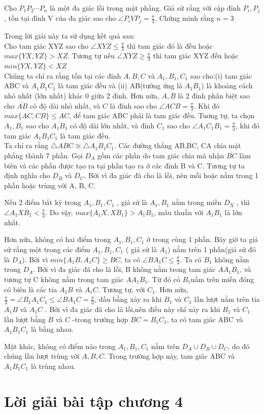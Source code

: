 \begin{baitap}
Cho $P_1P_2\cdots P_n$ là một đa giác lồi trong mặt phẳng. Giả sử rằng với cặp đỉnh $P_i,P_j$, tồn tại đỉnh V của đa giác sao cho $\angle P_iVP_j=\frac{\pi}{3}$. Chứng minh rằng $n=3$

\begin{loigiai4}
Trong lời giải này ta sử dụng kết quả sau:
\\ Cho tam giác XYZ sao cho $\angle XYZ \leq \frac{\pi}{3}$ thì tam giác đó là đều hoặc $max\{YX,YZ\}>XZ$. Tương tự nếu $\angle XYZ \geq \frac{\pi}{3}$ thì tam giác XYZ đều hoặc $min\{YX,YZ\}<XZ$
\\ Chúng ta chỉ ra rằng tồn tại các đỉnh $A, B, C$ và $ A_1, B_1, C_1$ sao cho:(i) tam giác ABC và $A_1B_1C_1$ là tam giác đều và (ii) AB(tướng ứng là $A_1B_1$) là khoảng cách nhỏ nhất (lớn nhất) khác 0 giữa 2 đỉnh. Hơn nữa, $A,B$ là 2 đỉnh phân biệt sao cho $\overline{AB}$ có độ dài nhỏ nhất, và $C$ là đỉnh sao cho $\angle ACB =\frac{\pi}{3}$. Khi đó $max\{AC,CB\}\leq AC$, để tam giác ABC phải là tam giác đều. Tuơng tự, ta chọn $A_1,B_1$ sao cho $\overline{A_1B_1}$ có độ dài lớn nhất, và đỉnh $C_1$ sao cho $\angle A_1C_1B_1=\frac{\pi}{3}$, khi đó tam giác $A_1B_1C_1$ là tam giác đều.\\
Ta chỉ ra rằng $\triangle ABC\cong \triangle A_1B_1C_1$. Các đường thẳng AB,BC, CA chia mặt phẳng thành 7 phần. Gọi $D_A$ gồm các phần do tam giác chia mà nhận $\overline{BC}$ làm biên và các phần được tạo ra tại phần tạo ra ở các đỉnh B và C. Tương tự ta định nghĩa cho $D_B$ và $D_C$. Bởi vì đa giác đã cho là lồi, nên mỗi hoặc nằm trong 1 phần hoặc trùng với  A, B, C.

Nếu 2 điểm bất kỳ trong $A_1, B_1,C_1$ , giả sử là $A_1,B_1$ nằm trong miền $D_X$ , thì $\angle A_1XB_1 <\frac{\pi}{3}$. Do vậy, $max\{A_1X,XB_1\}>A_1B_1$, mâu thuẫn với $A_1B_1$ là lớn nhất.

Hơn nữa, không có hai điểm trong $A_1,B_1,C_1$ ở trong cùng 1 phần. Bây giờ ta giả sử rằng một trong các điểm $A_1, B_1,C_1$ ( giả sử là $A_1$)  nằm trên 1 phần(giả sử đó là $D_A$). Bởi vì $min\{A_1B,A_1C\}\geq BC$, ta có $\angle BA_1C\leq \frac{\pi}{3}$. Ta có $B_1$ không nằm trong $D_A$. Bởi vì đa giác đã cho là lồi, B không nằm trong tam giác $AA_1B_1$, và tương tự C không nằm trong tam giác $AA_1B_1$. Từ đó có $B_1$nằm trên miền đóng có biên là các tia $A_1B$ và $A_1C$. Tương tự, với $C_1$. Hơn nữa, $\frac{\pi}{3}=\angle B_1A_1C_1\leq \angle BA_1C=\frac{\pi}{3}$, dấu bằng xảy ra khi $B_1$ và $C_1$ lần lượt nằm trên tia $A_1B$ và $A_1C$ . Bởi vì đa giác đã cho là lồi,nên điều này chỉ xảy ra khi $B_1$ và $C_1$ lần lượt bằng $B$ và $C$ -trong trường hợp $BC=B_1C_1$, ta có tam giác ABC và $A_1B_1C_1$ là bằng nhau.

Mặt khác, không có điểm nào trong $A_1,B_1,C_1$ nằm trên $D_A \cup D_B \cup D_C$, do đó chúng lần lượt trùng với $A, B, C$. Trong trường hợp này, tam giác ABC và $A_1B_1C_1$ là trùng nhau.
\end{loigiai4}
\end{baitap}

\section{Lời giải bài tập chương 4}
{\small}

